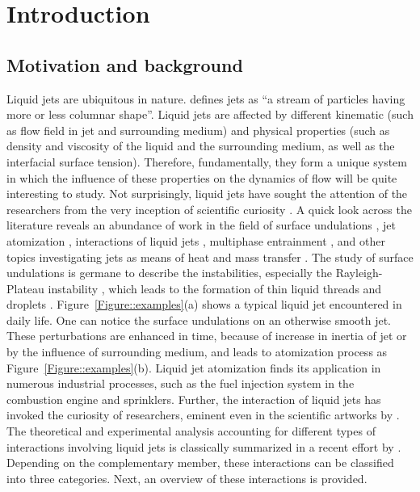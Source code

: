 \newcommand{\keyword}[1]{\textbf{#1}}
\newcommand{\tabhead}[1]{\textbf{#1}}
\newcommand{\code}[1]{\texttt{#1}}
\newcommand{\file}[1]{\texttt{\bfseries#1}}
\newcommand{\option}[1]{\texttt{\itshape#1}}
\chapter{Introduction}
\section{Motivation and background}
Liquid jets are ubiquitous in nature. \citet{eggers2008physics} defines jets as \textquotedblleft a stream of particles having more or less columnar shape\textquotedblright. Liquid jets are affected by different kinematic (such as flow field in jet and surrounding medium) and physical properties (such as density and viscosity of the liquid and the surrounding medium, as well as the interfacial surface tension). Therefore, fundamentally, they form a unique system in which the influence of these properties on the dynamics of flow will be quite interesting to study. Not surprisingly, liquid jets have sought the attention of the researchers from the very inception of scientific curiosity \citep{da1954notebooks}. A quick look across the literature reveals an abundance of work in the field of surface undulations \citep{rayleigh1879capillary,rayleigh1889tension,driessen2014control}, jet atomization \citep{matas2011experimental,matas2013flapping,ling2015multiscale,yang2017simulation}, interactions of liquid jets \citep{ibrahim1991impinging,bush2004collision,bremond2006atomization,koralek2018generation}, multiphase entrainment \citep{Van1976,Bin1993,Kersten2003,kiger2012air}, and other topics investigating jets as means of heat and mass transfer \citep{martin1977heat,kate2007hydraulic}. The study of surface undulations is germane to describe the instabilities, especially the Rayleigh-Plateau instability \citep{van2010breakup}, which leads to the formation of thin liquid threads and droplets \citep{baek2017simulation}. Figure~\ref{Figure::examples}(a) shows a typical liquid jet encountered in daily life. One can notice the surface undulations on an otherwise smooth jet. These perturbations are enhanced in time, because of increase in inertia of jet or by the influence of surrounding medium, and leads to atomization process as Figure~\ref{Figure::examples}(b). Liquid jet atomization finds its application in numerous industrial processes, such as the fuel injection system in the combustion engine and sprinklers. Further, the interaction of liquid jets has invoked the curiosity of researchers, eminent even in the scientific artworks by \citet{da1954notebooks}. The theoretical and experimental analysis accounting for different types of interactions involving liquid jets is classically summarized in a recent effort by \citet{eggers2008physics}. Depending on the complementary member, these interactions can be classified into three categories. Next, an overview of these interactions is provided.\\
